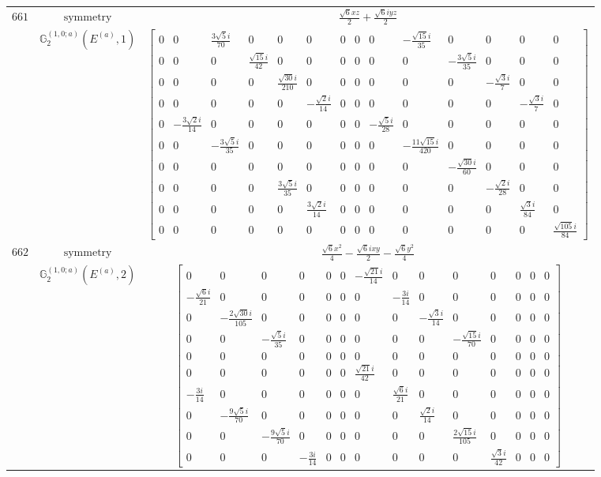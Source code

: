 \documentclass[fleqn,8pt,landscape]{jsarticle}
\begin{document}
\begin{longtable}{ccc}
$ 661 $ & $ \text{symmetry} $ & $ \frac{\sqrt{6} x z}{2} + \frac{\sqrt{6} i y z}{2} $ \\
$  $ & $ \mathbb{G}_{2}^{(1,0;a)}(E^{(a)},1) $ & $ \begin{bmatrix} 0 & 0 & \frac{3 \sqrt{5} i}{70} & 0 & 0 & 0 & 0 & 0 & 0 & - \frac{\sqrt{15} i}{35} & 0 & 0 & 0 & 0 \\ 0 & 0 & 0 & \frac{\sqrt{15} i}{42} & 0 & 0 & 0 & 0 & 0 & 0 & - \frac{3 \sqrt{5} i}{35} & 0 & 0 & 0 \\ 0 & 0 & 0 & 0 & \frac{\sqrt{30} i}{210} & 0 & 0 & 0 & 0 & 0 & 0 & - \frac{\sqrt{3} i}{7} & 0 & 0 \\ 0 & 0 & 0 & 0 & 0 & - \frac{\sqrt{2} i}{14} & 0 & 0 & 0 & 0 & 0 & 0 & - \frac{\sqrt{3} i}{7} & 0 \\ 0 & - \frac{3 \sqrt{2} i}{14} & 0 & 0 & 0 & 0 & 0 & 0 & - \frac{\sqrt{5} i}{28} & 0 & 0 & 0 & 0 & 0 \\ 0 & 0 & - \frac{3 \sqrt{5} i}{35} & 0 & 0 & 0 & 0 & 0 & 0 & - \frac{11 \sqrt{15} i}{420} & 0 & 0 & 0 & 0 \\ 0 & 0 & 0 & 0 & 0 & 0 & 0 & 0 & 0 & 0 & - \frac{\sqrt{30} i}{60} & 0 & 0 & 0 \\ 0 & 0 & 0 & 0 & \frac{3 \sqrt{5} i}{35} & 0 & 0 & 0 & 0 & 0 & 0 & - \frac{\sqrt{2} i}{28} & 0 & 0 \\ 0 & 0 & 0 & 0 & 0 & \frac{3 \sqrt{2} i}{14} & 0 & 0 & 0 & 0 & 0 & 0 & \frac{\sqrt{3} i}{84} & 0 \\ 0 & 0 & 0 & 0 & 0 & 0 & 0 & 0 & 0 & 0 & 0 & 0 & 0 & \frac{\sqrt{105} i}{84} \end{bmatrix} $ \\ \hline
$ 662 $ & $ \text{symmetry} $ & $ \frac{\sqrt{6} x^{2}}{4} - \frac{\sqrt{6} i x y}{2} - \frac{\sqrt{6} y^{2}}{4} $ \\
$  $ & $ \mathbb{G}_{2}^{(1,0;a)}(E^{(a)},2) $ & $ \begin{bmatrix} 0 & 0 & 0 & 0 & 0 & 0 & - \frac{\sqrt{21} i}{14} & 0 & 0 & 0 & 0 & 0 & 0 & 0 \\ - \frac{\sqrt{6} i}{21} & 0 & 0 & 0 & 0 & 0 & 0 & - \frac{3 i}{14} & 0 & 0 & 0 & 0 & 0 & 0 \\ 0 & - \frac{2 \sqrt{30} i}{105} & 0 & 0 & 0 & 0 & 0 & 0 & - \frac{\sqrt{3} i}{14} & 0 & 0 & 0 & 0 & 0 \\ 0 & 0 & - \frac{\sqrt{5} i}{35} & 0 & 0 & 0 & 0 & 0 & 0 & - \frac{\sqrt{15} i}{70} & 0 & 0 & 0 & 0 \\ 0 & 0 & 0 & 0 & 0 & 0 & 0 & 0 & 0 & 0 & 0 & 0 & 0 & 0 \\ 0 & 0 & 0 & 0 & 0 & 0 & \frac{\sqrt{21} i}{42} & 0 & 0 & 0 & 0 & 0 & 0 & 0 \\ - \frac{3 i}{14} & 0 & 0 & 0 & 0 & 0 & 0 & \frac{\sqrt{6} i}{21} & 0 & 0 & 0 & 0 & 0 & 0 \\ 0 & - \frac{9 \sqrt{5} i}{70} & 0 & 0 & 0 & 0 & 0 & 0 & \frac{\sqrt{2} i}{14} & 0 & 0 & 0 & 0 & 0 \\ 0 & 0 & - \frac{9 \sqrt{5} i}{70} & 0 & 0 & 0 & 0 & 0 & 0 & \frac{2 \sqrt{15} i}{105} & 0 & 0 & 0 & 0 \\ 0 & 0 & 0 & - \frac{3 i}{14} & 0 & 0 & 0 & 0 & 0 & 0 & \frac{\sqrt{3} i}{42} & 0 & 0 & 0 \end{bmatrix} $ \\ \hline

\end{longtable}
\end{document}
